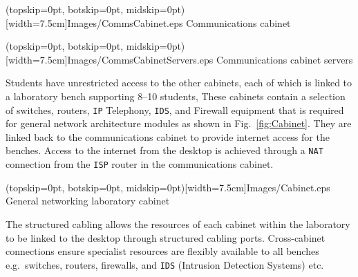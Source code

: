 \documentclass{ieeeaccess}
\begin{document}
\Figure[t!](topskip=0pt, botskip=0pt, midskip=0pt)[width=7.5cm]{Images/CommsCabinet.eps}
{Communications cabinet\label{fig:CommsCabinet}}

\Figure[t!](topskip=0pt, botskip=0pt, midskip=0pt)[width=7.5cm]{Images/CommsCabinetServers.eps}
{Communications cabinet servers\label{fig:CommsCabinetServers}}


Students have unrestricted access to the other cabinets, each of which is
linked to a laboratory bench supporting 8--10 students, These cabinets contain a selection of switches, routers, \texttt{IP} Telephony, \texttt{IDS}, and Firewall equipment that is required for general network architecture modules as shown in Fig.~\ref{fig:Cabinet}.
They are linked back to the communications cabinet to provide internet access
for the benches. Access to the internet from the desktop is achieved through a
\texttt{NAT} connection from the \texttt{ISP} router in the communications
cabinet. 

\Figure[t!](topskip=0pt, botskip=0pt, midskip=0pt)[width=7.5cm]{Images/Cabinet.eps}
{General networking laboratory cabinet\label{fig:Cabinet}}


The structured cabling allows the resources of each cabinet within the
laboratory to be linked to the desktop through structured cabling ports.
Cross-cabinet connections ensure specialist resources are flexibly available to
all benches e.g.\ switches, routers, firewalls, and \texttt{IDS} (Intrusion
Detection Systems) etc.
\end{document}
